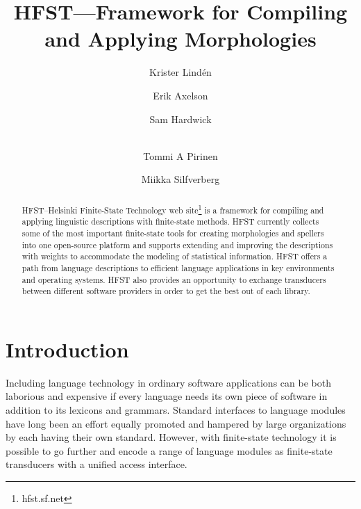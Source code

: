 \documentclass{llncs}
\begin{document}
%
\title{HFST---Framework for Compiling and Applying Morphologies}
%
\author{Krister Lind\'{e}n \and Erik Axelson \and Sam Hardwick \and\\
Tommi A Pirinen \and Miikka Silfverberg}


\maketitle


\begin{abstract}
HFST--Helsinki Finite-State Technology web site\footnote{hfst.sf.net}
is a framework for compiling and applying linguistic descriptions with
finite-state methods. 
HFST currently collects some of the most important finite-state tools for creating
morphologies and spellers into one open-source platform and supports
extending and improving the descriptions with weights to accommodate the modeling of
statistical information.
HFST offers a path from language descriptions to efficient language applications 
in key environments and operating systems. 
HFST also provides an opportunity to exchange transducers between 
different software providers in order to get the best out of each library. 
\end{abstract}


\section*{Introduction}
Including language technology in ordinary software applications can be
both laborious and expensive if every language needs its own piece of software
in addition to its lexicons and grammars. Standard interfaces
to language modules have long been an effort equally promoted and hampered 
by large organizations by each having their own standard.
However, with finite-state technology it is possible to go further and encode 
a range of language modules as finite-state transducers with a unified
access interface.
\end{document}
